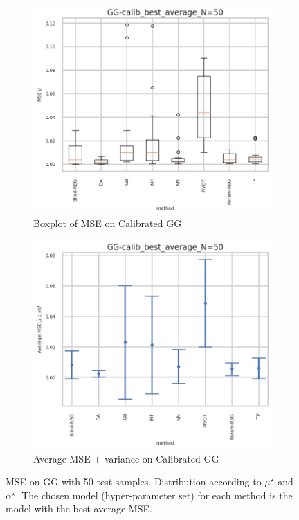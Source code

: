 \begin{figure}[ht!]
  \begin{subfigure}[t]{0.49\linewidth}
    \includegraphics[width=\linewidth]{COMPARE/GG-calib/BEST_MSE/GG-calib_best_average_N=50-boxplot_mse.png}
    \caption{Boxplot of MSE on Calibrated GG}
  \end{subfigure}%
  \hfill
  \begin{subfigure}[t]{0.49\linewidth}
    \includegraphics[width=\linewidth]{COMPARE/GG-calib/BEST_MSE/GG-calib_best_average_N=50-errplot_mse.png}
    \caption{Average MSE $\pm$ variance on Calibrated GG}
  \end{subfigure}

  \caption{MSE on GG with 50 test samples. Distribution according to $\mu^\star$ and $\alpha^\star$. The chosen model (hyper-parameter set) for each method is the model with the best average MSE.}
  \label{fig:compare_gg_best_mse50_samples}
\end{figure}


